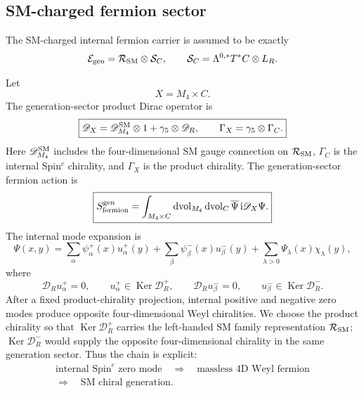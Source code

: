 \documentclass[aps,prd,preprint,notitlepage,nofootinbib,superscriptaddress,floatfix]{revtex4-2}
\newcommand{\dd}{\mathrm{d}}
\newcommand{\ii}{\mathrm{i}}
\newcommand{\Ker}{\operatorname{Ker}}
\newcommand{\cE}{\mathcal E}
\newcommand{\cR}{\mathcal R}
\newcommand{\cS}{\mathcal S}
\newcommand{\scrD}{\mathscr D}
\theoremstyle{remark}
\begin{document}
\subsection{SM-charged fermion sector}
\label{sec:sm_fermion_sector}

The SM-charged internal fermion carrier is assumed to be exactly
\begin{equation}
\cE_{\rm gen}
=
\cR_{\rm SM}\otimes \cS_C,
\qquad
\cS_C=\Lambda^{0,*}T^*C\otimes L_R.
\label{eq:generation_carrier}
\end{equation}

Let
\begin{equation}
X=M_4\times C.
\end{equation}
The generation-sector product Dirac operator is
\begin{equation}
\boxed{
\scrD_X
=
\scrD_{M_4}^{\rm SM}\otimes 1
+
\gamma_5\otimes\scrD_R,
\qquad
\Gamma_X=\gamma_5\otimes\Gamma_C.
}
\label{eq:product_dirac}
\end{equation}
Here \(\scrD_{M_4}^{\rm SM}\) includes the four-dimensional SM gauge connection on \(\cR_{\rm SM}\), \(\Gamma_C\) is the internal Spin\(^c\) chirality, and \(\Gamma_X\) is the product chirality.
The generation-sector fermion action is
\begin{equation}
\boxed{
S_{\rm fermion}^{\rm gen}
=
\int_{M_4\times C}
\dd{\rm vol}_{M_4}\,\dd{\rm vol}_{C}\,
\overline{\Psi}\,\ii\scrD_X\Psi .
}
\label{eq:product_fermion_action}
\end{equation}
The internal mode expansion is
\begin{equation}
\Psi(x,y)
=
\sum_{\alpha}\psi_\alpha^+(x)u_\alpha^+(y)
+
\sum_{\beta}\psi_\beta^-(x)u_\beta^-(y)
+
\sum_{\lambda>0}\Psi_\lambda(x)\chi_\lambda(y),
\label{eq:product_mode_expansion}
\end{equation}
where
\begin{equation}
\scrD_Ru_\alpha^+=0,
\qquad
u_\alpha^+\in\Ker\scrD_R^+,
\qquad
\scrD_Ru_\beta^-=0,
\qquad
u_\beta^-\in\Ker\scrD_R^-.
\label{eq:internal_zero_mode_conditions}
\end{equation}
After a fixed product-chirality projection, internal positive and negative zero modes produce opposite four-dimensional Weyl chiralities.
We choose the product chirality so that \(\Ker\scrD_R^+\) carries the left-handed SM family representation \(\cR_{\rm SM}\); \(\Ker\scrD_R^-\) would supply the opposite four-dimensional chirality in the same generation sector.
Thus the chain is explicit:
\begin{equation}
\begin{gathered}
\text{internal Spin}^{c}\text{ zero mode}
\quad\Longrightarrow\quad
\text{massless 4D Weyl fermion}
\\
\Longrightarrow\quad
\text{SM chiral generation}.
\end{gathered}
\end{equation}
\end{document}
